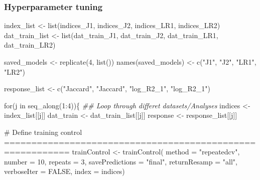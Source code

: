 \documentclass[
  letterpaper,
  DIV=11,
  numbers=noendperiod]{scrreprt}
\newenvironment{Shaded}{\begin{snugshade}}{\end{snugshade}}
\newcommand{\AttributeTok}[1]{\textcolor[rgb]{0.40,0.45,0.13}{#1}}
\newcommand{\CommentTok}[1]{\textcolor[rgb]{0.37,0.37,0.37}{#1}}
\newcommand{\ConstantTok}[1]{\textcolor[rgb]{0.56,0.35,0.01}{#1}}
\newcommand{\ControlFlowTok}[1]{\textcolor[rgb]{0.00,0.23,0.31}{#1}}
\newcommand{\DecValTok}[1]{\textcolor[rgb]{0.68,0.00,0.00}{#1}}
\newcommand{\DocumentationTok}[1]{\textcolor[rgb]{0.37,0.37,0.37}{\textit{#1}}}
\newcommand{\FunctionTok}[1]{\textcolor[rgb]{0.28,0.35,0.67}{#1}}
\newcommand{\NormalTok}[1]{\textcolor[rgb]{0.00,0.23,0.31}{#1}}
\newcommand{\OtherTok}[1]{\textcolor[rgb]{0.00,0.23,0.31}{#1}}
\newcommand{\SpecialCharTok}[1]{\textcolor[rgb]{0.37,0.37,0.37}{#1}}
\newcommand{\StringTok}[1]{\textcolor[rgb]{0.13,0.47,0.30}{#1}}
\begin{document}
\subsubsection{Hyperparameter tuning}\label{hyperparameter-tuning}

\begin{Shaded}
\begin{Highlighting}[]
\NormalTok{index\_list }\OtherTok{\textless{}{-}} \FunctionTok{list}\NormalTok{(indices\_J1, indices\_J2, indices\_LR1, indices\_LR2)}
\NormalTok{dat\_train\_list }\OtherTok{\textless{}{-}} \FunctionTok{list}\NormalTok{(dat\_train\_J1, dat\_train\_J2, dat\_train\_LR1, dat\_train\_LR2)}

\NormalTok{saved\_models }\OtherTok{\textless{}{-}} \FunctionTok{replicate}\NormalTok{(}\DecValTok{4}\NormalTok{, }\FunctionTok{list}\NormalTok{())}
\FunctionTok{names}\NormalTok{(saved\_models) }\OtherTok{\textless{}{-}} \FunctionTok{c}\NormalTok{(}\StringTok{"J1"}\NormalTok{, }\StringTok{"J2"}\NormalTok{, }\StringTok{"LR1"}\NormalTok{, }\StringTok{"LR2"}\NormalTok{)}


\NormalTok{response\_list }\OtherTok{\textless{}{-}} \FunctionTok{c}\NormalTok{(}\StringTok{"Jaccard"}\NormalTok{, }\StringTok{"Jaccard"}\NormalTok{, }\StringTok{"log\_R2\_1"}\NormalTok{, }\StringTok{"log\_R2\_1"}\NormalTok{)}

\ControlFlowTok{for}\NormalTok{(j }\ControlFlowTok{in} \FunctionTok{seq\_along}\NormalTok{(}\DecValTok{1}\SpecialCharTok{:}\DecValTok{4}\NormalTok{))\{}
  \DocumentationTok{\#\# Loop through differet datasets/Analyses}
\NormalTok{  indices }\OtherTok{\textless{}{-}}\NormalTok{ index\_list[[j]]}
\NormalTok{  dat\_train }\OtherTok{\textless{}{-}}\NormalTok{ dat\_train\_list[[j]]}
\NormalTok{  response }\OtherTok{\textless{}{-}}\NormalTok{ response\_list[[j]] }
  
  \CommentTok{\# Define training control ==========================================================}
\NormalTok{  trainControl }\OtherTok{\textless{}{-}} \FunctionTok{trainControl}\NormalTok{(}
    \AttributeTok{method =} \StringTok{"repeatedcv"}\NormalTok{,}
    \AttributeTok{number =} \DecValTok{10}\NormalTok{,}
    \AttributeTok{repeats =} \DecValTok{3}\NormalTok{,}
    \AttributeTok{savePredictions =} \StringTok{"final"}\NormalTok{,}
    \AttributeTok{returnResamp =} \StringTok{"all"}\NormalTok{,}
    \AttributeTok{verboseIter =} \ConstantTok{FALSE}\NormalTok{,}
    \AttributeTok{index =}\NormalTok{ indices)}


\end{Highlighting}
\end{Shaded}
\end{document}
